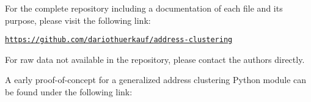 \documentclass[12pt,a4paper,titlepage,oneside,english]{article}
\begin{document}
For the complete repository including a documentation of each file and its purpose, please visit the following link:

\texttt{\url{https://github.com/dariothuerkauf/address-clustering}}

For raw data not available in the repository, please contact the authors directly.

A early proof-of-concept for a generalized address clustering Python module can be found under the following link:

\texttt{\url{}}
\end{document}
